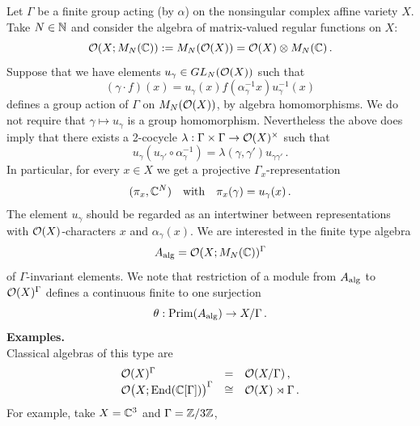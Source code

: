 Let $\Gamma$ be a finite group acting (by $\alpha$) on the nonsingular
complex affine variety $X$. Take $N \in \mathbb N$ and consider the
algebra of matrix-valued regular functions on $X$:
\begin{equation}
\mathcal O (X ; M_N (\mathbb C) ) := M_N (\mathcal O (X)) =
\mathcal O (X) \otimes M_N (\mathbb C ) \,.
\end{equation}
Suppose that we have elements $u_\gamma \in GL_N (\mathcal O (X))$ such that
\begin{equation}\label{eq:1.2}
(\gamma \cdot f) (x) = u_\gamma (x) f (\alpha_\gamma^{-1} x)
u_\gamma^{-1} (x)
\end{equation}
defines a group action of $\Gamma$ on $M_N (\mathcal O (X))$, by
algebra homomorphisms. We do not require that $\gamma \mapsto
u_\gamma$ is a group homomorphism. Nevertheless the above does imply 
that there exists a 2-cocycle $\lambda : \Gamma \times \Gamma \to \mathcal O
(X)^\times$ such that
\[
u_\gamma (u_{\gamma'} \circ \alpha_\gamma^{-1}) =
\lambda (\gamma , \gamma') u_{\gamma \gamma'} \,.
\]
In particular, for every $x \in X$ we get a projective $\Gamma_x$-representation
\begin{equation}\label{eq:1.18}
(\pi_x ,\mathbb C^N ) \quad \mathrm{with} \quad \pi_x (\gamma ) = u_\gamma (x) \,.
\end{equation}
The element $u_\gamma$ should be regarded as an intertwiner
between representations with $\mathcal O (X)$-characters $x$ and
$\alpha_\gamma (x)$. We are interested in the finite type algebra
\begin{equation}\label{eq:1.13}
A_\mathrm{alg} = \mathcal O (X ; M_N (\mathbb C ))^\Gamma
\end{equation}
of $\Gamma$-invariant elements. We note that restriction of a
module from $A_\mathrm{alg}$ to $\mathcal O (X)^\Gamma$ defines a continuous
finite to one surjection \cite[Lemma 1]{KNS}
\begin{equation}\label{eq:1.3}
\theta : \mathrm{Prim}(A_\mathrm{alg} ) \to X / \Gamma \,.
\end{equation}
\textbf{Examples.}\\
Classical algebras of this type are
\begin{equation}\label{eq:1.14}
\begin{array}{lll}
\mathcal O (X)^\Gamma & = & \mathcal O (X / \Gamma ) \,, \\
\mathcal O \big( X ; \mathrm{End} (\mathbb C [\Gamma]) \big)^\Gamma
& \cong & \mathcal O (X) \rtimes \Gamma \,.
\end{array}
\end{equation}
For example, take $X = \mathbb C^3$ and $\Gamma = \mathbb Z / 3 \mathbb Z$,
